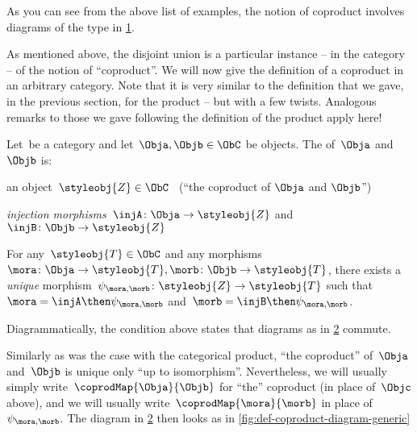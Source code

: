 As you can see from the above list of examples, the notion of coproduct involves diagrams of the type in \cref{fig:coprod_generic}.

  \begin{figure}[h!]
  \begin{center}
  \end{center}
  \caption{}
    \label{fig:coprod_generic}
  \end{figure}


As mentioned above, the disjoint union is a particular instance -- in the category \Set  -- of the notion of ``coproduct''.
We will now give the definition of a coproduct in an arbitrary category. Note that it is very similar to the definition that we gave, in the previous section, for the product -- but with a few twists. Analogous remarks to those we gave following the definition of the product apply here!

\begin{ctdefinition}[Coproduct]
  \label{def:catcoproduct}
  Let~\CatC be a category and let~$\Obja, \Objb \in \ObC$ be objects. The \emph{} of~$\Obja$ and~$\Objb$ is:  \\
  \constit
  \begin{compactenum}
    \item an object~$\styleobj{Z} \in \ObC$ \ (``the coproduct of $\Obja$ and $\Objb$'')
    \item \emph{injection morphisms}~$\injA \colon \Obja \to \styleobj{Z} $ and~$\injB \colon \Objb \to \styleobj{Z} $
  \end{compactenum}
  \condit
  \begin{compactenum}
    \item For any~$\styleobj{T} \in \ObC$ and any morphisms $\mora \colon  \Obja \to \styleobj{T}, \morb \colon \Objb \to \styleobj{T}$, there exists a \emph{unique} morphism~$\psi_{\mora, \morb} \colon \styleobj{Z} \to \styleobj{T}$ such that~$\mora = \injA\then \psi_{\mora, \morb}$ and~$\morb = \injB \then \psi_{\mora,\morb}$.
  \end{compactenum}
\end{ctdefinition}


\begin{remark}
  Diagrammatically, the condition above states that diagrams as in \cref{fig:coprod_general_1} commute.
  \begin{figure}[h!]
  \begin{center}
  \end{center}
    \caption{\label{fig:coprod_general_1}}
\end{figure}
  \label{fig:def-coproduct-diagram}
  Similarly as was the case with the categorical product, ``the coproduct'' of~$\Obja$ and~$\Objb$ is unique only ``up to isomorphism''.
  Nevertheless, we will usually simply write~$\coprodMap{\Obja}{\Objb}$ for ``the'' coproduct (in place of~$\Objc$ above), and we will usually write~$\coprodMap{\mora}{\morb}$ in place of~$\psi_{\mora, \morb}$.
  The diagram in \cref{fig:coprod_general_1} then looks as in \cref{fig:def-coproduct-diagram-generic}
\end{remark}

